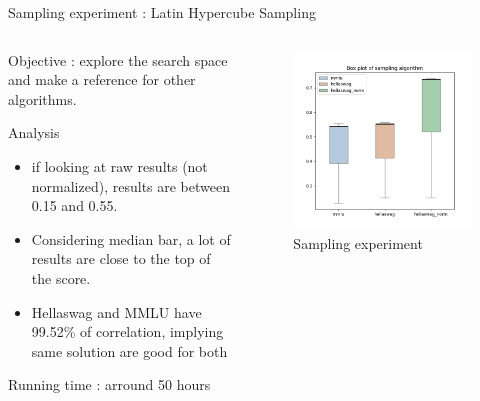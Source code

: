 \begin{frame}{Sampling experiment : Latin Hypercube Sampling}
    
    \begin{columns}
        \begin{column}{0.45\textwidth}
        Objective : explore the search space and make a reference for other algorithms.
        \begin{block}{Analysis}
            \begin{itemize}
                \item if looking at raw results (not normalized), results are between 0.15 and 0.55. 
                \item Considering median bar, a lot of results are close to the top of the score.
                \item Hellaswag and MMLU have 99.52\% of correlation, implying same solution are good for both
            \end{itemize}
            
        Running time : arround 50 hours
        
        \end{block}   
    \end{column}

    \begin{column}{0.45\textwidth}
        \begin{figure}
            \centering
            \includegraphics[width = \textwidth]{imgs/experiments/box_plot.png}     
            \caption{Sampling experiment}         
        \end{figure}
         
    \end{column}
\end{columns}  
    
\end{frame}



